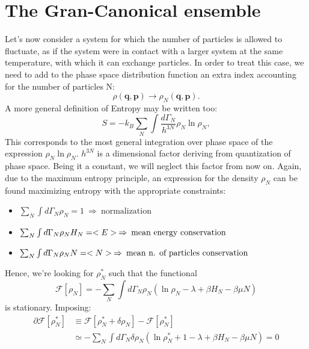 \section{The Gran-Canonical ensemble}
Let's now consider a system for which the number of particles is allowed to fluctuate, as if the system were in contact with a larger system at the same temperature, with which it can exchange particles. In order to treat this case, we need to add to the phase space distribution function an extra index accounting for the number of particles N:
\begin{equation}
    \rho(\textbf{q},\textbf{p}) \rightarrow \rho_N(\textbf{q},\textbf{p}).
\end{equation}
A more general definition of Entropy may be written too:
\begin{equation}
        S = -k_B \sum_N \int \frac{d\Gamma_N}{h^{3N}}  \rho_N\ln{\rho_N},\label{S}
\end{equation}
  This corresponds to the most general integration over phase space of the expression $\rho_N\ln{\rho_N}$. $h^{3N}$ is a dimensional factor deriving from quantization of phase space. Being it a constant, we will neglect this factor from now on. Again, due to the maximum entropy principle, an expression for the density $\rho_N$ can be found maximizing entropy with the appropriate constraints:
\begin{itemize}
    \item $\sum_N \int d\Gamma_N  \rho_N = 1 \: \Rightarrow \: \text{normalization} $\\
    \item $\sum_N \int d\Gamma_N  \rho_N H_N = <E> \: \Rightarrow \: \text{mean energy conservation}\\$
    \item $\sum_N \int d\Gamma_N  \rho_N N = <N> \: \Rightarrow \: \text{mean n. of particles conservation}\\$
\end{itemize}
Hence, we're looking for $\rho_N^*$ such that the functional 
\begin{equation}
    \mathcal{F}[\rho_N] = -\sum_N\int d\Gamma_N \rho_N ( \ln{\rho_N} - \lambda + \beta H_N - \beta \mu N)
\end{equation}
is stationary. Imposing: 
\begin{align}
    \partial\mathcal{F}[\rho_N^*] &\equiv \mathcal{F}[\rho_N^*+\delta\rho_N] - \mathcal{F}[\rho_N^*]\\
    &\simeq -\sum_N\int d\Gamma_N \delta\rho_N(\ln{\rho_N^*}+1-\lambda+\beta H_N -\beta \mu N)=0
\end{align}
